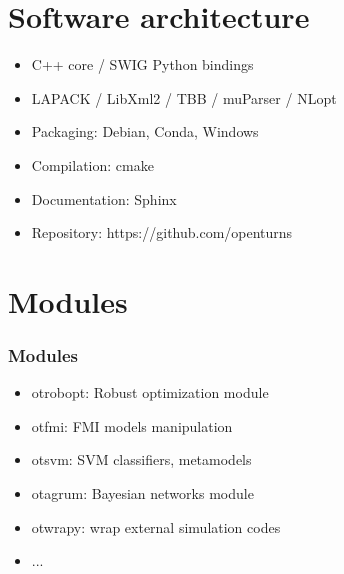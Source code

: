 \documentclass{beamer}
\begin{document}

\section{Software architecture}

\begin{frame}[containsverbatim]

\begin{itemize}
\item C++ core / SWIG Python bindings
\item LAPACK / LibXml2 / TBB / muParser / NLopt
\item Packaging: Debian, Conda, Windows
\item Compilation: cmake
\item Documentation: Sphinx
\item Repository: https://github.com/openturns
\end{itemize}

\end{frame}


\section{Modules}

\begin{frame}[containsverbatim]
\frametitle{Modules}

\begin{itemize}
\item otrobopt: Robust optimization module

\item otfmi: FMI models manipulation

\item otsvm: SVM classifiers, metamodels

\item otagrum: Bayesian networks module

\item otwrapy: wrap external simulation codes

\item ...
\end{itemize}

\end{frame}

\end{document}

